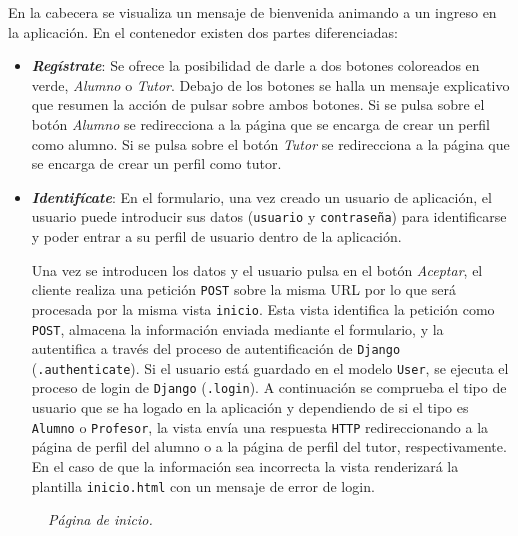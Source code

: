 \documentclass[a4paper, 12pt]{book}
\begin{document}
En la cabecera se visualiza un mensaje de bienvenida animando a un ingreso en la aplicaci\'on. En el contenedor existen dos partes diferenciadas: 
\begin{itemize}
  \item {\bfseries \textit{Reg\'istrate}}: Se ofrece la posibilidad de darle a dos botones coloreados en verde, \textit{Alumno} o \textit{Tutor}. Debajo 
  de los botones se halla un mensaje explicativo que resumen la acci\'on de pulsar sobre ambos botones. Si se pulsa sobre el bot\'on \textit{Alumno} se 
  redirecciona a la p\'agina que se encarga de crear un perfil como alumno. Si se pulsa sobre el bot\'on \textit{Tutor} se redirecciona a la p\'agina que 
  se encarga de crear un perfil como tutor.
  \item {\bfseries \textit{Identif\'icate}}: En el formulario, una vez creado un usuario de aplicaci\'on, el usuario puede introducir sus datos 
  (\texttt{usuario} y \texttt{contrase\~na}) para identificarse y poder entrar a su perfil de usuario dentro de la aplicaci\'on. 
  
  Una vez se introducen los datos y el usuario pulsa en el bot\'on \textit{Aceptar}, el cliente realiza una petici\'on \texttt{POST} sobre la misma URL 
  por lo que ser\'a procesada por la misma vista \texttt{inicio}. Esta vista identifica la petici\'on como \texttt{POST}, almacena la informaci\'on enviada
  mediante el formulario, y la autentifica a trav\'es del proceso de autentificaci\'on de \texttt{Django} (\texttt{.authenticate}). Si el usuario est\'a 
  guardado en el modelo \texttt{User}, se ejecuta el proceso de login de \texttt{Django} (\texttt{.login}). A continuaci\'on se comprueba el tipo de usuario
  que se ha logado en la aplicaci\'on y dependiendo de si el tipo es \texttt{Alumno} o \texttt{Profesor}, la vista env\'ia una respuesta \texttt{HTTP} 
  redireccionando a la p\'agina de perfil del alumno o a la p\'agina de perfil del tutor, respectivamente. En el caso de que la informaci\'on sea incorrecta 
  la vista renderizar\'a la plantilla \texttt{inicio.html} con un mensaje de error de login.
\end{itemize}

\begin{figure}
  \centering
  \caption{\textit{P\'agina de inicio.}}
  \label{fig:paginainicio}
\end{figure}
\end{document}
